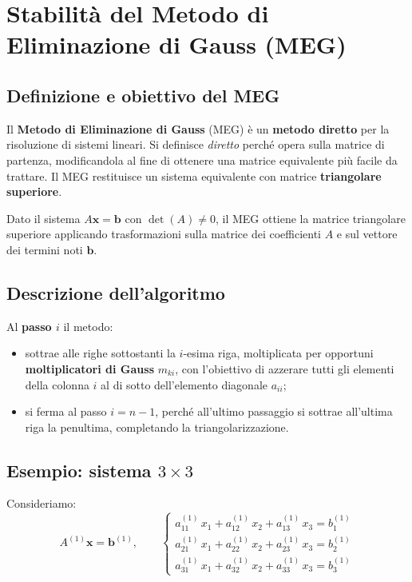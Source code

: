 \documentclass[a4paper,12pt]{article}
\theoremstyle{definition}
\theoremstyle{remark}
\begin{document}
\section{Stabilità del Metodo di Eliminazione di Gauss (MEG)}

\subsection{Definizione e obiettivo del MEG}

Il \textbf{Metodo di Eliminazione di Gauss} (MEG) è un \textbf{metodo
diretto} per la risoluzione di sistemi lineari. Si definisce \emph{diretto}
perché opera sulla matrice di partenza, modificandola al fine di ottenere
una matrice equivalente più facile da trattare. Il MEG restituisce un sistema
equivalente con matrice \textbf{triangolare superiore}.

Dato il sistema $A\mathbf{x} = \mathbf{b}$ con $\det(A)\neq 0$, il MEG
ottiene la matrice triangolare superiore applicando trasformazioni sulla
matrice dei coefficienti $A$ e sul vettore dei termini noti $\mathbf{b}$.

\subsection{Descrizione dell'algoritmo}

Al \textbf{passo $i$} il metodo:
\begin{itemize}
  \item sottrae alle righe sottostanti la $i$-esima riga, moltiplicata
        per opportuni \textbf{moltiplicatori di Gauss} $m_{ki}$, con
        l'obiettivo di azzerare tutti gli elementi della colonna $i$ al
        di sotto dell'elemento diagonale $a_{ii}$;
  \item si ferma al passo $i = n-1$, perché all'ultimo passaggio si
        sottrae all'ultima riga la penultima, completando la
        triangolarizzazione.
\end{itemize}

\subsection{Esempio: sistema $3 \times 3$}

Consideriamo:
\[
  A^{(1)}\mathbf{x} = \mathbf{b}^{(1)}, \qquad
  \begin{cases}
    a_{11}^{(1)}\,x_1 + a_{12}^{(1)}\,x_2 + a_{13}^{(1)}\,x_3 = b_1^{(1)} \\
    a_{21}^{(1)}\,x_1 + a_{22}^{(1)}\,x_2 + a_{23}^{(1)}\,x_3 = b_2^{(1)} \\
    a_{31}^{(1)}\,x_1 + a_{32}^{(1)}\,x_2 + a_{33}^{(1)}\,x_3 = b_3^{(1)}
  \end{cases}
\]
\end{document}
